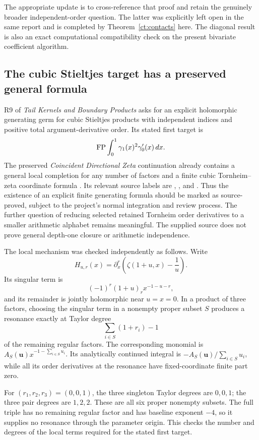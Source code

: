 The appropriate update is to cross-reference that proof and retain the
genuinely broader independent-order question. The latter was explicitly
left open in the same report and is completed by
Theorem~\ref{ct:contacts} here. The diagonal result is also an exact
computational compatibility check on the present bivariate coefficient
algorithm.

\subsection{The cubic Stieltjes target has a preserved general formula}

R9 of \emph{Tail Kernels and Boundary Products} asks for an explicit
holomorphic generating germ for cubic Stieltjes products with independent
indices and positive total argument-derivative order. Its stated first
target is
\[
 \operatorname{FP}\int_0^1\gamma_1(x)^2\gamma_0'(x)\,d x.
\]
The preserved \emph{Coincident Directional Zeta} continuation already
contains a general local completion for any number of factors and a finite
cubic Tornheim--zeta coordinate formula
\cite{ProveItCubic}. Its relevant source labels are
,
, and .
Thus the existence of an explicit finite generating formula should be
marked as source-proved, subject to the project's normal integration and
review process. The further question of reducing selected retained
Tornheim order derivatives to a smaller arithmetic alphabet remains
meaningful. The supplied source does not prove general depth-one closure
or arithmetic independence.

The local mechanism was checked independently as follows. Write
\[
 H_{u,r}(x)=\partial_x^r\left(\zeta(1+u,x)-\frac1u\right).
\]
Its singular term is
\[
 (-1)^r(1+u)_r x^{-1-u-r},
\]
and its remainder is jointly holomorphic near \(u=x=0\). In a product
of three factors, choosing the singular term in a nonempty proper subset
\(S\) produces a resonance exactly at Taylor degree
\begin{equation}\label{au:resonant-degree}
  \sum_{i\in S}(1+r_i)-1
\end{equation}
of the remaining regular factors. The corresponding monomial is
\(A_S(\boldsymbol u)x^{-1-\sum_{i\in S}u_i}\). Its analytically
continued integral is
\(-A_S(\boldsymbol u)/\sum_{i\in S}u_i\), while all its order derivatives
at the resonance have fixed-coordinate finite part zero.

For \((r_1,r_2,r_3)=(0,0,1)\), the three singleton Taylor degrees are
\(0,0,1\); the three pair degrees are \(1,2,2\). These are all six
proper nonempty subsets. The full triple has no remaining regular factor
and has baseline exponent \(-4\), so it supplies no resonance through the
parameter origin. This checks the number and degrees of the local terms
required for the stated first target.

